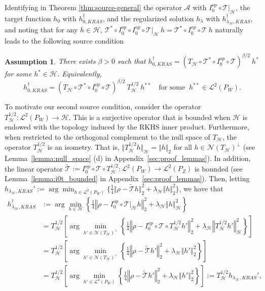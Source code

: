 \documentclass[twoside,11pt]{article}
\newtheorem{assumption}{Assumption}
\newcommand{\mc}{\mathcal}
\begin{document}
Identifying in Theorem \ref{thm:source-general} the operator $\mc{A}$ with $I_0^{op} \circ \mc{T} \vert_\mc{H}$, the target function $h_0$ with $h_{0,KRAS}^\dag$, and the regularized solution $h_\lambda$ with $h_{\lambda_{\mc{H}},KRAS}^\dag$, and noting that for any $h \in \mc{H}$, $\mc{T}^*\circ I_0^{op} \circ I_0^{op} \circ \mc{T}\vert_\mc{H} \:h=  \mc{T}^*\circ I_0^{op} \circ \mc{T} \: h $ naturally leads to the following source condition
\begin{assumption}
    There exists $\beta >0$ such that $  h_{0,KRAS}^\dag = (T_{\mc{H}}\circ\mc{T}^* \circ I_0^{op}\circ  \mc{T})^{\beta/2} \: h^{*}$ for some $h^{*} \in \mc{H}$. Equivalently, 
    \begin{equation}
    h_{0,KRAS}^\dag = (T_{\mc{H}}\circ\mc{T}^* \circ I_0^{op}\circ \mc{T})^{\beta/2} \: T_\mc{H}^{1/2} \: h^{**} \quad \text{for some } \: h^{**} \in \mc{L}^2(P_W).
    \label{eq:source-kras-basic}
    \end{equation}
    \label{ass:source-basic}
\end{assumption}
  To motivate our second source condition, consider the operator $T_\mc{H}^{1/2} :\mc{L}^2(P_W) \rightarrow \mc{H}$. This is a surjective operator that is bounded when $\mc{H}$ is endowed with the topology induced by the RKHS inner product. Furthermore, when restricted to the orthogonal complement to the null space of $T_\mc{H}$, the operator $T_\mc{H}^{1/2}$ is an isometry. That is, $\Vert T_\mc{H}^{1/2} h \Vert_{\mc{H}} = \Vert h \Vert_2$ for all $h\in \mc{N}(T_\mc{H})^\perp$ (see Lemma~\ref{lemma:null_space} (d) in Appendix~\ref{sec:proof_lemmas}). In addition, the linear operator $\widetilde{\mc{T}}:=I_0^{op} \circ \mc{T}\circ T_\mc{H}^{1/2}:\mc{L}^2(P_W)\rightarrow\mc{L}^2(P_Z)$ is bounded (see Lemma~\ref{lemma:i0t_bounded} in Appendix~\ref{sec:proof_lemmas}). Then, letting $h_{\lambda_{\mc{H}},KRAS}':=\arg\min_{h\in\mathcal{L}^2(P_{W})}\{\frac{1}{4}\Vert\rho-\widetilde{\mc{T}}h\Vert_2^2+\lambda_{\mc{H}}\Vert h\Vert_2^2\}$, we have that
 \begin{align*}
 h_{\lambda_{\mc{H}},KRAS}^\dag
&:=\arg\min_{h\in\mc{H}}\left\{\frac{1}{4}\left\Vert\rho- I_0^{op} \circ \mc{T}|_\mc{H}h\right\Vert_2^2+\lambda_{\mc{H}}\left\Vert h\right\Vert_{\mc{H}}^2\right\}\\
&=T_\mc{H}^{1/2}\left[\arg\min_{h'\in\mc{N}(T_\mc{H})^\perp}\left\{\frac{1}{4}\left\Vert\rho- I_0^{op} \circ \mc{T}\circ T_\mc{H}^{1/2}h'\right\Vert_2^2+\lambda_{\mc{H}}\left\Vert T_\mc{H}^{1/2}h'\right\Vert_{\mc{H}}^2\right\}\right]\\
     &=T_\mc{H}^{1/2}\left[\arg\min_{h'\in\mc{N}(T_\mc{H})^\perp}\left\{\frac{1}{4}\left\Vert\rho- \widetilde{\mc{T}}h'\right\Vert_2^2+\lambda_{\mc{H}}\left\Vert h'\right\Vert_2^2\right\}\right]\\
      &=T_\mc{H}^{1/2}\left[\arg\min_{h'\in\mc{L}^2(P_W)}\left\{\frac{1}{4}\left\Vert\rho- \widetilde{\mc{T}}h'\right\Vert_2^2+\lambda_{\mc{H}}\left\Vert h'\right\Vert_2^2\right\}\right]:=T_\mc{H}^{1/2}h_{\lambda_{\mc{H}},KRAS}',
\end{align*}
\end{document}
